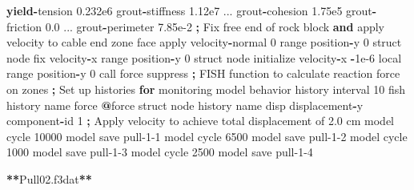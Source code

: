 \documentclass[a4paper, nobind]{templates/ociamthesis}
\newenvironment{Shaded}{\begin{snugshade}}{\end{snugshade}}
\newcommand{\BuiltInTok}[1]{#1}
\newcommand{\ControlFlowTok}[1]{\textcolor[rgb]{0.13,0.29,0.53}{\textbf{#1}}}
\newcommand{\DecValTok}[1]{\textcolor[rgb]{0.00,0.00,0.81}{#1}}
\newcommand{\FloatTok}[1]{\textcolor[rgb]{0.00,0.00,0.81}{#1}}
\newcommand{\KeywordTok}[1]{\textcolor[rgb]{0.13,0.29,0.53}{\textbf{#1}}}
\newcommand{\NormalTok}[1]{#1}
\newcommand{\OperatorTok}[1]{\textcolor[rgb]{0.81,0.36,0.00}{\textbf{#1}}}
\newcommand{\StringTok}[1]{\textcolor[rgb]{0.31,0.60,0.02}{#1}}
\renewenvironment{Shaded}
{
  \vspace{10pt}%
  \begin{snugshade}%
}{%
  \end{snugshade}%
  \vspace{8pt}%
}
\begin{document}
\begin{Shaded}
\begin{Highlighting}[]
                          \ControlFlowTok{yield}\OperatorTok{{-}}\NormalTok{tension }\FloatTok{0.232e6}\NormalTok{ grout}\OperatorTok{{-}}\NormalTok{stiffness }\FloatTok{1.12e7}\NormalTok{ ...}
\NormalTok{                          grout}\OperatorTok{{-}}\NormalTok{cohesion }\FloatTok{1.75e5}\NormalTok{ grout}\OperatorTok{{-}}\NormalTok{friction }\FloatTok{0.0}\NormalTok{ ...}
\NormalTok{                          grout}\OperatorTok{{-}}\NormalTok{perimeter }\FloatTok{7.85e{-}2}
    \OperatorTok{;}\NormalTok{ Fix free end of rock block }\KeywordTok{and} \BuiltInTok{apply}\NormalTok{ velocity to cable end}
\NormalTok{    zone face }\BuiltInTok{apply}\NormalTok{ velocity}\OperatorTok{{-}}\NormalTok{normal }\DecValTok{0} \BuiltInTok{range}\NormalTok{ position}\OperatorTok{{-}}\NormalTok{y }\DecValTok{0}
\NormalTok{    struct node fix velocity}\OperatorTok{{-}}\NormalTok{x                    }\BuiltInTok{range}\NormalTok{ position}\OperatorTok{{-}}\NormalTok{y }\DecValTok{0}
\NormalTok{    struct node initialize velocity}\OperatorTok{{-}}\NormalTok{x }\OperatorTok{{-}}\FloatTok{1e{-}6}\NormalTok{ local }\BuiltInTok{range}\NormalTok{ position}\OperatorTok{{-}}\NormalTok{y }\DecValTok{0}
\NormalTok{    call }\StringTok{\textquotesingle{}force\textquotesingle{}}\NormalTok{ suppress }\OperatorTok{;}\NormalTok{ FISH function to calculate reaction force on zones}
    \OperatorTok{;}\NormalTok{ Set up histories }\ControlFlowTok{for}\NormalTok{ monitoring model behavior}
\NormalTok{    history interval }\DecValTok{10}
\NormalTok{    fish history name }\StringTok{\textquotesingle{}force\textquotesingle{}} \OperatorTok{@}\NormalTok{force}
\NormalTok{    struct node history name }\StringTok{\textquotesingle{}disp\textquotesingle{}}\NormalTok{ displacement}\OperatorTok{{-}}\NormalTok{y component}\OperatorTok{{-}}\BuiltInTok{id} \DecValTok{1}
    \OperatorTok{;}\NormalTok{ Apply velocity to achieve total displacement of }\FloatTok{2.0}\NormalTok{ cm}
\NormalTok{    model cycle }\DecValTok{10000}
\NormalTok{    model save }\StringTok{\textquotesingle{}pull{-}1{-}1\textquotesingle{}}
\NormalTok{    model cycle }\DecValTok{6500}
\NormalTok{    model save }\StringTok{\textquotesingle{}pull{-}1{-}2\textquotesingle{}}
\NormalTok{    model cycle }\DecValTok{1000}
\NormalTok{    model save }\StringTok{\textquotesingle{}pull{-}1{-}3\textquotesingle{}}
\NormalTok{    model cycle }\DecValTok{2500}
\NormalTok{    model save }\StringTok{\textquotesingle{}pull{-}1{-}4\textquotesingle{}}

\OperatorTok{**}\NormalTok{Pull02.f3dat}\OperatorTok{**}


\end{Highlighting}
\end{Shaded}
\end{document}
